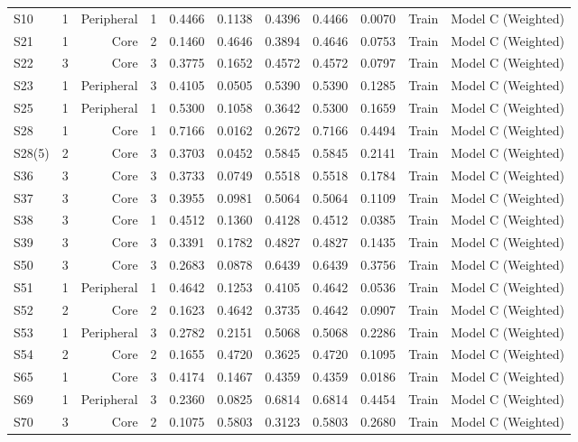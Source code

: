 {\begin{longtable}{lrrrrrrrrrr}
  S10 & 1 & Peripheral & 1 & 0.4466 & 0.1138 & 0.4396 & 0.4466 & 0.0070 & Train & Model C (Weighted) \\
  S21 & 1 & Core & 2 & 0.1460 & 0.4646 & 0.3894 & 0.4646 & 0.0753 & Train & Model C (Weighted) \\
  S22 & 3 & Core & 3 & 0.3775 & 0.1652 & 0.4572 & 0.4572 & 0.0797 & Train & Model C (Weighted) \\
  S23 & 1 & Peripheral & 3 & 0.4105 & 0.0505 & 0.5390 & 0.5390 & 0.1285 & Train & Model C (Weighted) \\
  S25 & 1 & Peripheral & 1 & 0.5300 & 0.1058 & 0.3642 & 0.5300 & 0.1659 & Train & Model C (Weighted) \\
  S28 & 1 & Core & 1 & 0.7166 & 0.0162 & 0.2672 & 0.7166 & 0.4494 & Train & Model C (Weighted) \\
  S28(5) & 2 & Core & 3 & 0.3703 & 0.0452 & 0.5845 & 0.5845 & 0.2141 & Train & Model C (Weighted) \\
  S36 & 3 & Core & 3 & 0.3733 & 0.0749 & 0.5518 & 0.5518 & 0.1784 & Train & Model C (Weighted) \\
  S37 & 3 & Core & 3 & 0.3955 & 0.0981 & 0.5064 & 0.5064 & 0.1109 & Train & Model C (Weighted) \\
  S38 & 3 & Core & 1 & 0.4512 & 0.1360 & 0.4128 & 0.4512 & 0.0385 & Train & Model C (Weighted) \\
  S39 & 3 & Core & 3 & 0.3391 & 0.1782 & 0.4827 & 0.4827 & 0.1435 & Train & Model C (Weighted) \\
  S50 & 3 & Core & 3 & 0.2683 & 0.0878 & 0.6439 & 0.6439 & 0.3756 & Train & Model C (Weighted) \\
  S51 & 1 & Peripheral & 1 & 0.4642 & 0.1253 & 0.4105 & 0.4642 & 0.0536 & Train & Model C (Weighted) \\
  S52 & 2 & Core & 2 & 0.1623 & 0.4642 & 0.3735 & 0.4642 & 0.0907 & Train & Model C (Weighted) \\
  S53 & 1 & Peripheral & 3 & 0.2782 & 0.2151 & 0.5068 & 0.5068 & 0.2286 & Train & Model C (Weighted) \\
  S54 & 2 & Core & 2 & 0.1655 & 0.4720 & 0.3625 & 0.4720 & 0.1095 & Train & Model C (Weighted) \\
  S65 & 1 & Core & 3 & 0.4174 & 0.1467 & 0.4359 & 0.4359 & 0.0186 & Train & Model C (Weighted) \\
  S69 & 1 & Peripheral & 3 & 0.2360 & 0.0825 & 0.6814 & 0.6814 & 0.4454 & Train & Model C (Weighted) \\
  S70 & 3 & Core & 2 & 0.1075 & 0.5803 & 0.3123 & 0.5803 & 0.2680 & Train & Model C (Weighted) \\

\end{longtable}}
